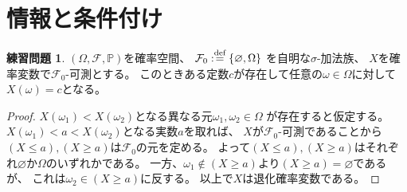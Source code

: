 \documentclass[uplatex]{jsarticle}
\theoremstyle{definition}
\newtheorem{prob}[prob]{練習問題}
\renewcommand{\emptyset}{\varnothing}
\def\P{\mathbb{P}}
\def\mcF{\mathcal{F}}
\def\dfn{:\overset{\mbox{{\scriptsize def}}}{=}}
\begin{document}
\newpage


\section{情報と条件付け}\label{section: 2}



\begin{prob}\label{prob: 2.1}
  \((\Omega,\mcF,\P)\)を確率空間、
  \(\mcF_0 \dfn \left\{ \emptyset, \Omega\right\}\)
  を自明な\(\sigma\)-加法族、
  \(X\)を確率変数で\(\mcF_0\)-可測とする。
  このときある定数\(c\)が存在して任意の\(\omega\in \Omega\)に対して
  \(X(\omega)=c\)となる。
\end{prob}

\begin{proof}
  \(X(\omega_1)< X(\omega_2)\)となる異なる元\(\omega_1,\omega_2\in \Omega\)
  が存在すると仮定する。
  \(X(\omega_1) < a < X(\omega_2)\)となる実数\(a\)を取れば、
  \(X\)が\(\mcF_0\)-可測であることから
  \((X \leq a), (X\geq a)\)は\(\mcF_0\)の元を定める。
  よって\((X\leq a), (X \geq a)\)はそれぞれ\(\emptyset\)か\(\Omega\)のいずれかである。
  一方、\(\omega_1\not\in (X\geq a)\)より\((X\geq a) = \emptyset\)であるが、
  これは\(\omega_2 \in (X\geq a)\)に反する。
  以上で\(X\)は退化確率変数である。
\end{proof}
\end{document}
